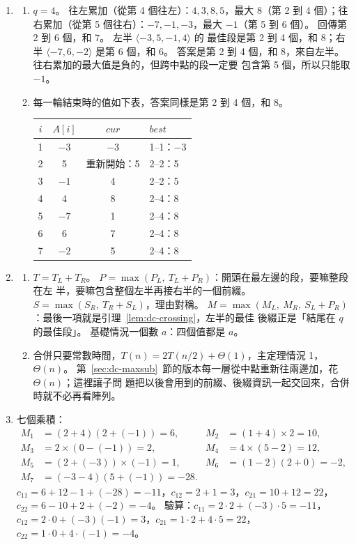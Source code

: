 \begin{enumerate}
\item
\begin{enumerate}
\item $q = 4$。 往左累加（從第 4 個往左）：$4, 3, 8, 5$，最大 $8$（第 2 到 4 個）；往
右累加（從第 5 個往右）：$-7, -1, -3$，最大 $-1$（第 5 到 6 個）。
 回傳第 2 到 6 個，和 $7$。 左半 $\langle -3, 5, -1, 4 \rangle$ 的
最佳段是第 2 到 4 個，和 $8$；右半 $\langle -7, 6, -2 \rangle$ 是第 6 個，和 $6$。
答案是第 2 到 4 個，和 $8$，來自左半。 往右累加的最大值是負的，但跨中點的段一定要
包含第 5 個，所以只能取 $-1$。
\item 每一輪結束時的值如下表，答案同樣是第 2 到 4 個，和 $8$。
\begin{center}
\begin{tabular}{cccl}
\toprule
$i$ & $A[i]$ & $\mathit{cur}$ & $\mathit{best}$ \\
\midrule
1 & $-3$ & $-3$ & 1--1：$-3$ \\
2 & 5 & 重新開始：5 & 2--2：5 \\
3 & $-1$ & 4 & 2--2：5 \\
4 & 4 & 8 & 2--4：8 \\
5 & $-7$ & 1 & 2--4：8 \\
6 & 6 & 7 & 2--4：8 \\
7 & $-2$ & 5 & 2--4：8 \\
\bottomrule
\end{tabular}
\end{center}
\end{enumerate}

\item
\begin{enumerate}
\item $T = T_L + T_R$。 $P = \max(P_L,\ T_L + P_R)$：開頭在最左邊的段，要嘛整段在左
半，要嘛包含整個左半再接右半的一個前綴。 $S = \max(S_R,\ T_R + S_L)$，理由對稱。
$M = \max(M_L,\ M_R,\ S_L + P_R)$：最後一項就是引理~\ref{lem:dc-crossing}，左半的最佳
後綴正是「結尾在 $q$ 的最佳段」。 基礎情況一個數 $a$：四個值都是 $a$。
\item 合併只要常數時間，$T(n) = 2T(n/2) + \Theta(1)$，主定理情況 1，$\Theta(n)$。
第~\ref{sec:dc-maxsub}~節的版本每一層從中點重新往兩邊加，花 $\Theta(n)$；這裡讓子問
題把以後會用到的前綴、後綴資訊一起交回來，合併時就不必再看陣列。
\end{enumerate}

\item 七個乘積：
\[
\begin{aligned}
M_1 &= (2 + 4)(2 + (-1)) = 6, & M_2 &= (1 + 4) \times 2 = 10, \\
M_3 &= 2 \times (0 - (-1)) = 2, & M_4 &= 4 \times (5 - 2) = 12, \\
M_5 &= (2 + (-3)) \times (-1) = 1, & M_6 &= (1 - 2)(2 + 0) = -2, \\
M_7 &= (-3 - 4)(5 + (-1)) = -28.
\end{aligned}
\]
$c_{11} = 6 + 12 - 1 + (-28) = -11$，$c_{12} = 2 + 1 = 3$，$c_{21} = 10 + 12 = 22$，
$c_{22} = 6 - 10 + 2 + (-2) = -4$。 驗算：$c_{11} = 2 \cdot 2 + (-3) \cdot 5 = -11$，
$c_{12} = 2 \cdot 0 + (-3)(-1) = 3$，$c_{21} = 1 \cdot 2 + 4 \cdot 5 = 22$，
$c_{22} = 1 \cdot 0 + 4 \cdot (-1) = -4$。


\end{enumerate}
